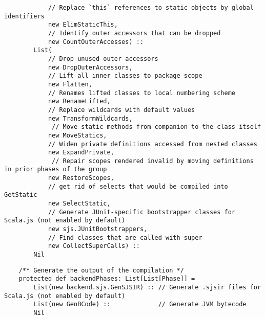 \documentclass[letterpaper,12pt,titlepage,oneside,final]{book}
\begin{document}
\begin{verbatim}
			// Replace `this` references to static objects by global identifiers
			new ElimStaticThis,         
			// Identify outer accessors that can be dropped
			new CountOuterAccesses) :: 
		List(
			// Drop unused outer accessors
			new DropOuterAccessors,     
			// Lift all inner classes to package scope
			new Flatten,                
			// Renames lifted classes to local numbering scheme
			new RenameLifted,           
			// Replace wildcards with default values
			new TransformWildcards,     
			 // Move static methods from companion to the class itself
			new MoveStatics,           
			// Widen private definitions accessed from nested classes
			new ExpandPrivate,          
			 // Repair scopes rendered invalid by moving definitions in prior phases of the group
			new RestoreScopes,         
			// get rid of selects that would be compiled into GetStatic
			new SelectStatic,           
			// Generate JUnit-specific bootstrapper classes for Scala.js (not enabled by default)
			new sjs.JUnitBootstrappers, 
			// Find classes that are called with super
			new CollectSuperCalls) ::   
		Nil
\end{verbatim}

\begin{verbatim}
	/** Generate the output of the compilation */
	protected def backendPhases: List[List[Phase]] =
		List(new backend.sjs.GenSJSIR) :: // Generate .sjsir files for Scala.js (not enabled by default)
		List(new GenBCode) ::             // Generate JVM bytecode
		Nil
\end{verbatim}
\end{document}
